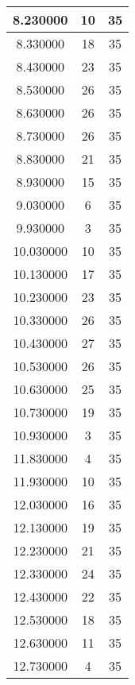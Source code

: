 \begin{longtable}[htbp]{|c|c|c|}
8.230000 & 10 & 35 \\ \hline
8.330000 & 18 & 35 \\ \hline
8.430000 & 23 & 35 \\ \hline
8.530000 & 26 & 35 \\ \hline
8.630000 & 26 & 35 \\ \hline
8.730000 & 26 & 35 \\ \hline
8.830000 & 21 & 35 \\ \hline
8.930000 & 15 & 35 \\ \hline
9.030000 & 6 & 35 \\ \hline
9.930000 & 3 & 35 \\ \hline
10.030000 & 10 & 35 \\ \hline
10.130000 & 17 & 35 \\ \hline
10.230000 & 23 & 35 \\ \hline
10.330000 & 26 & 35 \\ \hline
10.430000 & 27 & 35 \\ \hline
10.530000 & 26 & 35 \\ \hline
10.630000 & 25 & 35 \\ \hline
10.730000 & 19 & 35 \\ \hline
10.930000 & 3 & 35 \\ \hline
11.830000 & 4 & 35 \\ \hline
11.930000 & 10 & 35 \\ \hline
12.030000 & 16 & 35 \\ \hline
12.130000 & 19 & 35 \\ \hline
12.230000 & 21 & 35 \\ \hline
12.330000 & 24 & 35 \\ \hline
12.430000 & 22 & 35 \\ \hline
12.530000 & 18 & 35 \\ \hline
12.630000 & 11 & 35 \\ \hline
12.730000 & 4 & 35 \\ \hline
\end{longtable}
